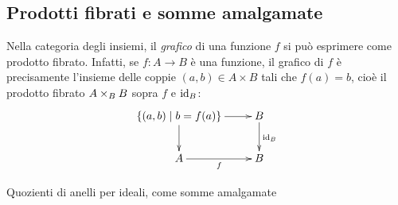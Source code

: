 \subsection{Prodotti fibrati e somme amalgamate}
\begin{example}\label{ex_lim_grafici}
 Nella categoria degli insiemi, il \emph{grafico} di una funzione \(f\) si può esprimere come prodotto fibrato. Infatti, se \(f \colon A\to B\) è una funzione, il grafico di \(f\) è precisamente l'insieme delle coppie \((a,b)\in A\times B\) tali che \(f(a)=b\), cioè il prodotto fibrato \(A \times_{B} B\) sopra $f$ e $\mathrm{id}_B$:
 \[\xymatrix{
   \{(a,b)\mid b=f(a)\} \ar[r]\ar[d] & B \ar[d]^{\id_B} \\
   A \ar[r]_{f} & B
  }\]
\end{example}
\begin{notation}\label{exa_cart_quadrati}
\end{notation}
\begin{remark}
\end{remark}
\begin{example}\label{exa_semidiretto}
\end{example}
\begin{example}\label{exa_vanchiappe}
\end{example}
\begin{example}\label{exa_quoziente_R_su_I}
 Quozienti di anelli per ideali, come somme amalgamate
\end{example}
\begin{esercizi}
 \item
 \item
 \item
 \item
 \item
\end{esercizi}

